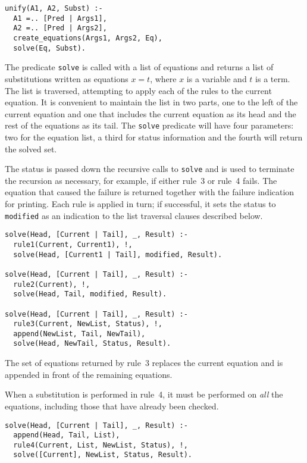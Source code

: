 \documentclass[11pt]{article}
\newcommand*{\p}[1]{\textup{\texttt{#1}}}
\begin{document}
\begin{verbatim}
unify(A1, A2, Subst) :-
  A1 =.. [Pred | Args1],
  A2 =.. [Pred | Args2],
  create_equations(Args1, Args2, Eq),
  solve(Eq, Subst).
\end{verbatim}

The predicate \p{solve} is called with a list of equations and returns a
list of substitutions written as equations $x=t$, where $x$ is a
variable and $t$ is a term. The list is traversed, attempting to apply
each of the rules to the current equation. It is convenient to maintain
the list in two parts, one to the left of the current equation and one
that includes the current equation as its head and the rest of the
equations as its tail. The \p{solve} predicate will have four
parameters: two for the equation list, a third for status information
and the fourth will return the solved set.

The status is passed down the recursive calls to \p{solve} and is used
to terminate the recursion as necessary, for example, if either rule~3
or rule~4 fails. The equation that caused the failure is returned
together with the failure indication for printing. Each rule is applied
in turn; if successful, it sets the status to \p{modified} as an
indication to the list traversal clauses described below.

\begin{verbatim}
solve(Head, [Current | Tail], _, Result) :-
  rule1(Current, Current1), !,
  solve(Head, [Current1 | Tail], modified, Result).

solve(Head, [Current | Tail], _, Result) :-
  rule2(Current), !,
  solve(Head, Tail, modified, Result).

solve(Head, [Current | Tail], _, Result) :-
  rule3(Current, NewList, Status), !,
  append(NewList, Tail, NewTail),
  solve(Head, NewTail, Status, Result).
\end{verbatim}

The set of equations returned by rule~3 replaces the current equation
and is appended in front of the remaining equations.

When a substitution is performed in rule~4, it must be performed on
\emph{all} the equations, including those that have already been
checked.

\begin{verbatim}
solve(Head, [Current | Tail], _, Result) :-
  append(Head, Tail, List),
  rule4(Current, List, NewList, Status), !,
  solve([Current], NewList, Status, Result).
\end{verbatim}
\end{document}
